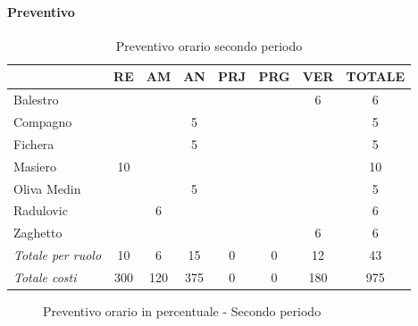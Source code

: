 \documentclass[a4paper,12pt]{article}
\begin{document}
            \paragraph{Preventivo}
                \begin{table}[H]
                \centering
                \caption{Preventivo orario secondo periodo}
                \begin{tabular}{|l|c|c|c|c|c|c|c|}
                \hline
                    \rowcolor{lightgray}{\textbf{Membro}} & {\textbf{RE}} & {\textbf{AM}} & {\textbf{AN}} & {\textbf{PRJ}} & {\textbf{PRG}} & {\textbf{VER}} & {\textbf{TOTALE}}\\
                \hline
                    Balestro & & & & & & 6 & 6\\
                \hline
                    Compagno & & & 5 & & & & 5\\
                \hline
                    Fichera & & & 5 & & & & 5\\
                \hline
                    Masiero & 10 & & & & & & 10\\
                \hline
                    Oliva Medin & & & 5 & & & & 5\\
                \hline
                    Radulovic & & 6 & & & & & 6\\
                \hline
                    Zaghetto & & & & & & 6 & 6\\
                \hline
                    \rowcolor{lightgray}\textit{Totale per ruolo} & 10 & 6 & 15 & 0 & 0 & 12 & 43\\
                \hline
                    \rowcolor{lightgray}\textit{Totale costi} & 300 & 120 & 375 & 0 & 0 & 180 & 975\\
                \hline
                \end{tabular}
                \end{table}

                \begin{figure}[H]
                \centering
                \caption{Preventivo orario in percentuale - Secondo periodo}
                \end{figure}
        
\end{document}
